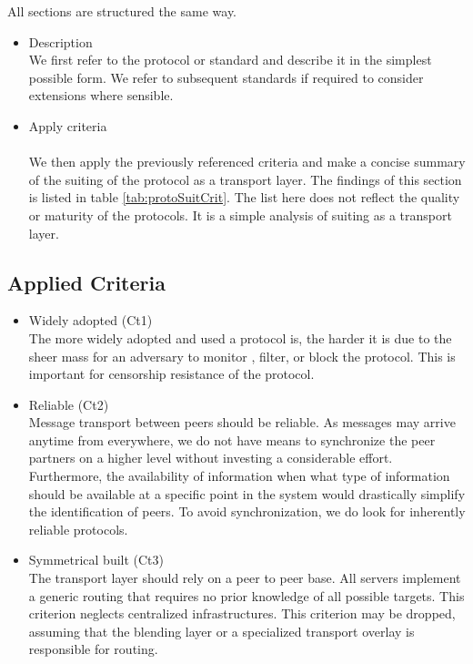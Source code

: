 \documentclass[a4paper,appendixprefix,pdfusetitle,twocolumn,fontsize=8pt,DIV=calc,8pt,draft]{\doctype} %
\begin{document}
All sections are structured the same way. 
\begin{itemize}
	\item Description\\
	We first refer to the protocol or standard and describe it in the simplest possible form. We refer to subsequent standards if required to consider extensions where sensible.
	\item Apply criteria\\\\
	We then apply the previously referenced criteria and make a concise summary of the suiting of the protocol as a transport layer. The findings of this section is listed in table \ref{tab:protoSuitCrit}. The list here does not reflect the quality or maturity of the protocols. It is a simple analysis of suiting as a transport layer.
\end{itemize} 

\subsection{Applied Criteria}
\begin{itemize}
	\item Widely adopted (Ct1)\\
	The more widely adopted and used a protocol is, the harder it is due to the sheer mass for an adversary to monitor , filter, or block the protocol. This is important for censorship resistance of the protocol. 
	\item Reliable (Ct2)\\
	Message transport between peers should be reliable. As messages may arrive anytime from everywhere, we do not have means to synchronize the peer partners on a higher level without investing a considerable effort. Furthermore, the availability of information when what type of information should be available at a specific point in the system would drastically simplify the identification of peers. To avoid synchronization, we do look for inherently reliable protocols.
	\item Symmetrical built (Ct3)\\
	The transport layer should rely on a peer to peer base. All servers implement a generic routing that requires no prior knowledge of all possible targets. This criterion neglects centralized infrastructures. This criterion may be dropped, assuming that the blending layer or a specialized transport overlay is responsible for routing.
\end{itemize}
\end{document}
